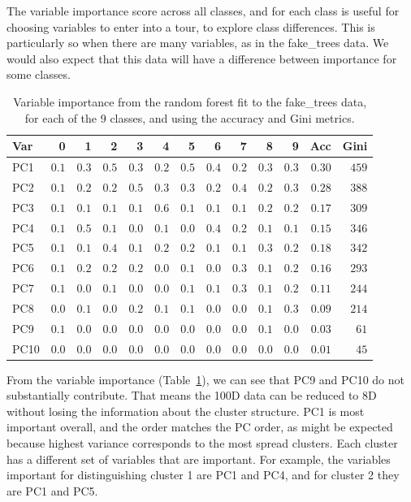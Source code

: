 \documentclass[
  letterpaper,
]{krantz}
\begin{document}

The variable importance score across all classes, and for each class is
useful for choosing variables to enter into a tour, to explore class
differences. This is particularly so when there are many variables, as
in the fake\_trees data. We would also expect that this data will have a
difference between importance for some classes.

\hypertarget{tbl-ft-importance}{}
\begin{longtable}{lrrrrrrrrrrrr}
\caption{\label{tbl-ft-importance}Variable importance from the random forest fit to the fake\_trees data,
for each of the 9 classes, and using the accuracy and Gini metrics. }\tabularnewline

\toprule
Var & 0 & 1 & 2 & 3 & 4 & 5 & 6 & 7 & 8 & 9 & Acc & Gini \\ 
\midrule
PC1 & $0.1$ & $0.3$ & $0.5$ & $0.3$ & $0.2$ & $0.5$ & $0.4$ & $0.2$ & $0.3$ & $0.3$ & $0.30$ & $459$ \\ 
PC2 & $0.1$ & $0.2$ & $0.2$ & $0.5$ & $0.3$ & $0.3$ & $0.2$ & $0.4$ & $0.2$ & $0.3$ & $0.28$ & $388$ \\ 
PC3 & $0.1$ & $0.1$ & $0.1$ & $0.1$ & $0.6$ & $0.1$ & $0.1$ & $0.1$ & $0.2$ & $0.2$ & $0.17$ & $309$ \\ 
PC4 & $0.1$ & $0.5$ & $0.1$ & $0.0$ & $0.1$ & $0.0$ & $0.4$ & $0.2$ & $0.1$ & $0.1$ & $0.15$ & $346$ \\ 
PC5 & $0.1$ & $0.1$ & $0.4$ & $0.1$ & $0.2$ & $0.2$ & $0.1$ & $0.1$ & $0.3$ & $0.2$ & $0.18$ & $342$ \\ 
PC6 & $0.1$ & $0.2$ & $0.2$ & $0.2$ & $0.0$ & $0.1$ & $0.0$ & $0.3$ & $0.1$ & $0.2$ & $0.16$ & $293$ \\ 
PC7 & $0.1$ & $0.0$ & $0.1$ & $0.0$ & $0.0$ & $0.1$ & $0.1$ & $0.3$ & $0.1$ & $0.2$ & $0.11$ & $244$ \\ 
PC8 & $0.0$ & $0.1$ & $0.0$ & $0.2$ & $0.1$ & $0.1$ & $0.0$ & $0.0$ & $0.1$ & $0.3$ & $0.09$ & $214$ \\ 
PC9 & $0.1$ & $0.0$ & $0.0$ & $0.0$ & $0.0$ & $0.0$ & $0.0$ & $0.0$ & $0.1$ & $0.0$ & $0.03$ & $61$ \\ 
PC10 & $0.0$ & $0.0$ & $0.0$ & $0.0$ & $0.0$ & $0.0$ & $0.0$ & $0.0$ & $0.0$ & $0.0$ & $0.01$ & $45$ \\ 
\bottomrule
\end{longtable}

From the variable importance (Table~\ref{tbl-ft-importance}), we can see
that PC9 and PC10 do not substantially contribute. That means the 100D
data can be reduced to 8D without losing the information about the
cluster structure. PC1 is most important overall, and the order matches
the PC order, as might be expected because highest variance corresponds
to the most spread clusters. Each cluster has a different set of
variables that are important. For example, the variables important for
distinguishing cluster 1 are PC1 and PC4, and for cluster 2 they are PC1
and PC5.
\end{document}
